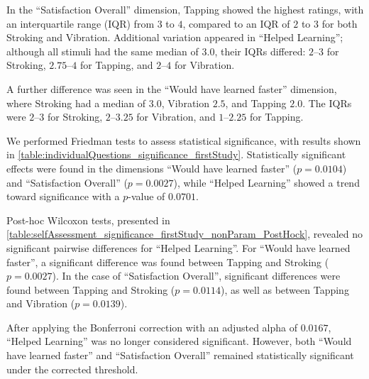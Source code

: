 In the \enquote{Satisfaction Overall} dimension, Tapping showed the highest ratings, with an interquartile range (IQR) from $3$ to $4$, compared to an IQR of $2$ to $3$ for both Stroking and Vibration. Additional variation appeared in \enquote{Helped Learning}; although all stimuli had the same median of $3.0$, their IQRs differed: $2$–$3$ for Stroking, $2.75$–$4$ for Tapping, and $2$–$4$ for Vibration. 

A further difference was seen in the \enquote{Would have learned faster} dimension, where Stroking had a median of $3.0$, Vibration $2.5$, and Tapping $2.0$. The IQRs were $2$–$3$ for Stroking, $2$–$3.25$ for Vibration, and $1$–$2.25$ for Tapping.

We performed Friedman tests to assess statistical significance, with results shown in \autoref{table:individualQuestions_significance_firstStudy}. Statistically significant effects were found in the dimensions \enquote{Would have learned faster} ($p = 0.0104$) and \enquote{Satisfaction Overall} ($p = 0.0027$), while \enquote{Helped Learning} showed a trend toward significance with a $p$-value of $0.0701$.

Post-hoc Wilcoxon tests, presented in \autoref{table:selfAssessment_significance_firstStudy_nonParam_PostHock}, revealed no significant pairwise differences for \enquote{Helped Learning}. For \enquote{Would have learned faster}, a significant difference was found between Tapping and Stroking ($p = 0.0027$). In the case of \enquote{Satisfaction Overall}, significant differences were found between Tapping and Stroking ($p = 0.0114$), as well as between Tapping and Vibration ($p = 0.0139$).

After applying the Bonferroni correction with an adjusted alpha of $0.0167$, \enquote{Helped Learning} was no longer considered significant. However, both \enquote{Would have learned faster} and \enquote{Satisfaction Overall} remained statistically significant under the corrected threshold.


